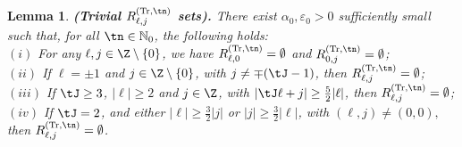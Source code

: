\documentclass[a4paper,reqno,10pt]{article}
\newtheorem{lem}{Lemma}[section]
\begin{document}
\begin{lem}\label{lemma.empty.n.TR}
{\bf (Trivial $R_{\ell,j}^{({\rm Tr},\tn)}$ sets).}
    There exist $\alpha_{0}, \varepsilon_{0} > 0$ sufficiently small such that, for all $\tn \in \mathbb{N}_0$, the following holds:
    \\[1mm]
    \noindent $(i)$ For any $\ell,j\in\Z\setminus\{0\}$, we have $R_{\ell,0}^{({\rm Tr},\tn)}=\emptyset$ and $R_{0,j}^{({\rm Tr},\tn)}=\emptyset$;
    \\[1mm]
    \noindent $(ii)$ If $\ell=\pm 1$ and $j\in\Z\setminus\{0\}$, with $j\neq \mp(\tJ-1)$, then  $R_{\ell,j}^{({\rm Tr},\tn)}=\emptyset$;
    \\[1mm]
    \noindent $(iii)$ If $\tJ\geq 3$, $|\ell|\geq 2$ and $j\in\Z$, with   $|\tJ \ell + j| \geq \tfrac52 |\ell|$, then $R_{\ell,j}^{({\rm Tr},\tn)}=\emptyset$;
    \\[1mm]
    \noindent $(iv)$ If $\tJ=2$, and either $|\ell|\geqslant\tfrac32|j|$ or $|j|\geqslant\tfrac32|\ell|$, with $(\ell,j)\neq(0,0),$ then $R_{\ell,j}^{({\rm Tr},\tn)}=\emptyset$.
\end{lem}
\end{document}
